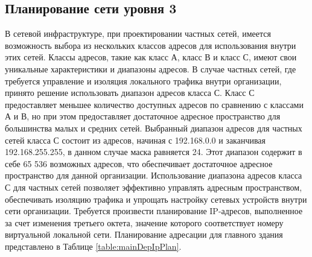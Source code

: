 \documentclass[14pt, a4paper]{extarticle}
\numberwithin{equation}{section}
\begin{document}
\newpage
\subsection{Планирование сети уровня 3}
В сетевой инфраструктуре, при проектировании частных сетей, имеется
возможность выбора из нескольких классов адресов для использования внутри
этих сетей. Классы адресов, такие как класс А, класс В и класс С, имеют свои
уникальные характеристики и диапазоны адресов.
В случае частных сетей, где требуется управление и изоляция локального
трафика внутри организации, принято решение использовать диапазон адресов
класса С. Класс С предоставляет меньшее количество доступных адресов по
сравнению с классами А и В, но при этом предоставляет достаточное адресное
пространство для большинства малых и средних сетей.
Выбранный диапазон адресов для частных сетей класса С состоит из
адресов, начиная с 192.168.0.0 и заканчивая 192.168.255.255, в данном случае
маска равняется 24. Этот диапазон содержит в себе 65 536 возможных адресов,
что обеспечивает достаточное адресное пространство для данной организации.
Использование диапазона адресов класса С для частных сетей позволяет
эффективно управлять адресным пространством, обеспечивать изоляцию
трафика и упрощать настройку сетевых устройств внутри сети организации.
Требуется произвести планирование IP-адресов, выполненное за счет
изменения третьего октета, значение которого соответствует номеру
виртуальной локальной сети. 
Планирование адресации для главного здания представлено в Таблице \ref{table:mainDepIpPlan}.
\newpage
\end{document}
